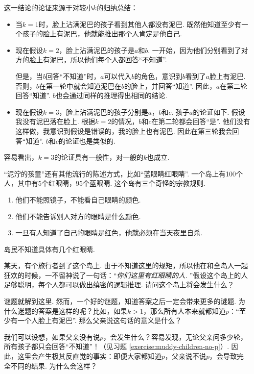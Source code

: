 这一结论的论证来源于对较小$k$的归纳总结：
\begin{itemize}
    \item 当$k=1$时，脸上沾满泥巴的孩子看到其他人都没有泥巴. 既然他知道至少有一个孩子的脸上有泥巴，他就能推出那个人肯定是他自己. 
    \item 现在假设$k=2$，脸上沾满泥巴的孩子是$a$和$b$. 一开始，因为他们分别看到了对方的脸上有泥巴，所以他们每个人都回答“不知道”. 
    
    但是，当$b$回答“不知道”时，$a$可以代入$b$的角色，意识到$b$看到了$a$脸上有泥巴. 否则，$b$在第一轮中就会知道泥巴在$b$的脸上，并回答“知道”. 因此，$a$在第二轮回答“知道”. $b$也会通过同样的推理得出相同的结论. 

    \item 现在假设$k=3$，脸上沾满泥巴的孩子分别是$a$，$b$和$c$. 孩子$a$的论证如下. 假设我没有泥巴落在脸上. 根据$k=2$的情况，$b$和$c$在第二轮都会回答“是”. 他们没有这样做，我意识到假设是错误的，我的脸上也有泥巴. 因此在第三轮我会回答“知道”. $b$和$c$的论证也是类似的.
\end{itemize}
容易看出，$k=3$的论证具有一般性，对一般的$k$也成立.

\begin{remark}
“泥泞的孩童”还有其他流行的陈述方式，比如“蓝眼睛红眼睛”. 一个岛上有100个人，其中有5个红眼睛，95个蓝眼睛. 这个岛有三个奇怪的宗教规则.
    \begin{enumerate}
        \item 他们不能照镜子，不能看自己眼睛的颜色. 
        \item 他们不能告诉别人对方的眼睛是什么颜色. 
        \item 一旦有人知道了自己的眼睛是红色，他就必须在当天夜里自杀.
    \end{enumerate}
岛民不知道具体有几个红眼睛. 

某天，有个旅行者到了这个岛上. 由于不知道这里的规矩，所以他在和全岛人一起狂欢的时候，一不留神说了一句话：“\textit{你们这里有红眼睛的人. }”假设这个岛上的人足够聪明，每个人都可以做出缜密的逻辑推理. 请问这个岛上将会发生什么？
\end{remark}

谜题就解到这里. 然而，一个好的谜题，知道答案之后一定会带来更多的谜题. 为什么迷题的答案是这样的呢？比如，如果$k>1$，那么所有人本来就都知道$p$：“至少有一个人脸上有泥巴”. 那么父亲说这句话的意义是什么？

我们可以设想，如果父亲没有说$p$，会发生什么？容易发现，无论父亲问多少轮，所有孩子都只会回答“不知道”！（见习题 \ref{exercise:muddy-children-no-p}）. 因此，这里会产生极其反直觉的事实：即便大家都知道$p$，父亲说不说$p$，会导致完全不同的结果. 为什么会这样？

